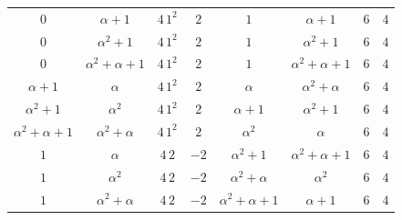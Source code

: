 \begin{tabular}{@{}cccc@{\qquad\qquad}cccc@{}}
$0$ & $\alpha+1$ & $4\,1^2$ & $2$ & $1$ & $\alpha+1$ & $6$ & $4$\\
$0$ & $\alpha^2+1$ & $4\,1^2$ & $2$ & $1$ & $\alpha^2+1$ & $6$ & $4$\\
$0$ & $\alpha^2+\alpha+1$ & $4\,1^2$ & $2$ & $1$ & $\alpha^2+\alpha+1$ & $6$ & $4$\\
$\alpha+1$ & $\alpha$ & $4\,1^2$ & $2$ & $\alpha$ & $\alpha^2+\alpha$ & $6$ & $4$\\
$\alpha^2+1$ & $\alpha^2$ & $4\,1^2$ & $2$ & $\alpha+1$ & $\alpha^2+1$ & $6$ & $4$\\
$\alpha^2+\alpha+1$ & $\alpha^2+\alpha$ & $4\,1^2$ & $2$ & $\alpha^2$ & $\alpha$ & $6$ & $4$\\
$1$ & $\alpha$ & $4\,2$ & $-2$ & $\alpha^2+1$ & $\alpha^2+\alpha+1$ & $6$ & $4$\\
$1$ & $\alpha^2$ & $4\,2$ & $-2$ & $\alpha^2+\alpha$ & $\alpha^2$ & $6$ & $4$\\
$1$ & $\alpha^2+\alpha$ & $4\,2$ & $-2$ & $\alpha^2+\alpha+1$ & $\alpha+1$ & $6$ & $4$\\
\bottomrule
\end{tabular}

